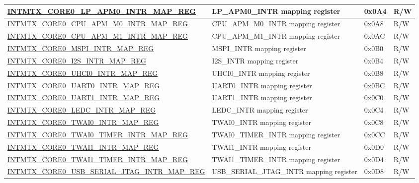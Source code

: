 \begin{longtable}{ | p{10cm} | p{10cm} | p{1.3cm} | p{1cm} | }
\hyperref[regdesc:INTMTXCORE0LPAPM0INTRMAPREG]{INTMTX\_CORE0\_LP\_APM0\_INTR\_MAP\_REG} & LP\_APM0\_INTR mapping register & 0x0A4 & R/W  \\ \hline
\hyperref[regdesc:INTMTXCORE0CPUAPMM0INTRMAPREG]{INTMTX\_CORE0\_CPU\_APM\_M0\_INTR\_MAP\_REG} & CPU\_APM\_M0\_INTR mapping register & 0x0A8 & R/W  \\ \hline
\hyperref[regdesc:INTMTXCORE0CPUAPMM1INTRMAPREG]{INTMTX\_CORE0\_CPU\_APM\_M1\_INTR\_MAP\_REG} & CPU\_APM\_M1\_INTR mapping register & 0x0AC & R/W  \\ \hline
\hyperref[regdesc:INTMTXCORE0MSPIINTRMAPREG]{INTMTX\_CORE0\_MSPI\_INTR\_MAP\_REG} & MSPI\_INTR mapping register & 0x0B0 & R/W  \\ \hline
\hyperref[regdesc:INTMTXCORE0I2SINTRMAPREG]{INTMTX\_CORE0\_I2S\_INTR\_MAP\_REG} & I2S\_INTR mapping register & 0x0B4 & R/W  \\ \hline
\hyperref[regdesc:INTMTXCORE0UHCI0INTRMAPREG]{INTMTX\_CORE0\_UHCI0\_INTR\_MAP\_REG} & UHCI0\_INTR mapping register & 0x0B8 & R/W  \\ \hline
\hyperref[regdesc:INTMTXCORE0UART0INTRMAPREG]{INTMTX\_CORE0\_UART0\_INTR\_MAP\_REG} & UART0\_INTR mapping register & 0x0BC & R/W  \\ \hline
\hyperref[regdesc:INTMTXCORE0UART1INTRMAPREG]{INTMTX\_CORE0\_UART1\_INTR\_MAP\_REG} & UART1\_INTR mapping register & 0x0C0 & R/W  \\ \hline
\hyperref[regdesc:INTMTXCORE0LEDCINTRMAPREG]{INTMTX\_CORE0\_LEDC\_INTR\_MAP\_REG} & LEDC\_INTR mapping register & 0x0C4 & R/W  \\ \hline
\hyperref[regdesc:INTMTXCORE0TWAI0INTRMAPREG]{INTMTX\_CORE0\_TWAI0\_INTR\_MAP\_REG} & TWAI0\_INTR mapping register & 0x0C8 & R/W  \\ \hline
\hyperref[regdesc:INTMTXCORE0TWAI0TIMERINTRMAPREG]{INTMTX\_CORE0\_TWAI0\_TIMER\_INTR\_MAP\_REG} & TWAI0\_TIMER\_INTR mapping register & 0x0CC & R/W  \\ \hline
\hyperref[regdesc:INTMTXCORE0TWAI1INTRMAPREG]{INTMTX\_CORE0\_TWAI1\_INTR\_MAP\_REG} & TWAI1\_INTR mapping register & 0x0D0 & R/W  \\ \hline
\hyperref[regdesc:INTMTXCORE0TWAI1TIMERINTRMAPREG]{INTMTX\_CORE0\_TWAI1\_TIMER\_INTR\_MAP\_REG} & TWAI1\_TIMER\_INTR mapping register & 0x0D4 & R/W  \\ \hline
\hyperref[regdesc:INTMTXCORE0USBSERIALJTAGINTRMAPREG]{INTMTX\_CORE0\_USB\_SERIAL\_JTAG\_INTR\_MAP\_REG} & USB\_SERIAL\_JTAG\_INTR mapping register & 0x0D8 & R/W  \\ \hline

\end{longtable}

